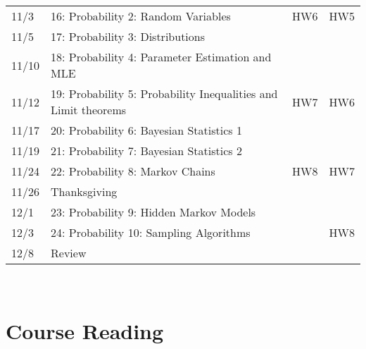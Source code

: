 \documentclass[11pt]{article}
\begin{document}
\begin{centering}
\begin{tabular}{||l|p{3in}|l|l||}
11/3 & 16: Probability 2: Random Variables  & HW6  & HW5  \\ 
11/5 & 17: Probability 3: Distributions &  &  \\ 
\hline

11/10 & 18: Probability 4: Parameter Estimation and MLE &   & \\  
11/12& 19: Probability 5:  Probability Inequalities and Limit theorems & HW7 & HW6   \\  
\hline
11/17 & 20: Probability 6: Bayesian Statistics 1 &   & \\  
11/19& 21: Probability 7: Bayesian Statistics 2 &  &   \\  
\hline
11/24 & 22: Probability 8: Markov Chains  & HW8  & HW7 \\
11/26 & Thanksgiving &   &  \\  
\hline

12/1 & 23: Probability 9: Hidden Markov Models &  &  \\
12/3 & 24: Probability 10: Sampling Algorithms &   & HW8 \\ 
\hline
12/8& Review &  &  \\

\hline\hline

\end{tabular}\\
\end{centering}

\newpage
\section*{Course Reading}
\end{document}
